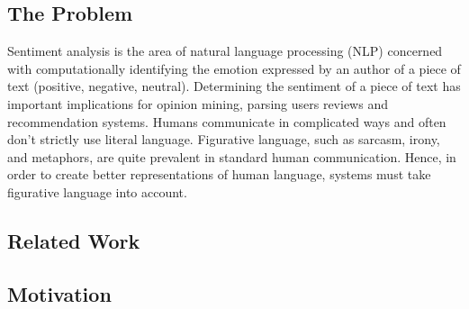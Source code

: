 \subsection{The Problem} %
\label{sub:the_problem}
Sentiment analysis is the area of natural language processing (NLP) concerned with computationally identifying the emotion expressed by an author of a piece of text (positive, negative, neutral). Determining the sentiment of a piece of text has important implications for opinion mining, parsing users reviews and recommendation systems. Humans communicate in complicated ways and often don't strictly use literal language. Figurative language, such as sarcasm, irony, and metaphors, are quite prevalent in standard human communication. Hence, in order to create better representations of human language, systems must take figurative language into account.

\subsection{Related Work} %
\label{sub:related_work}


\subsection{Motivation} %
\label{sub:motivation}

